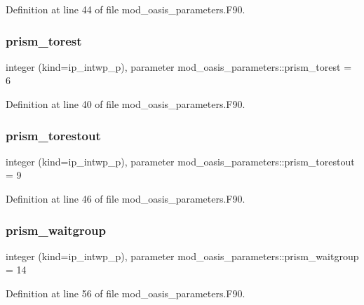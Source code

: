 Definition at line 44 of file mod\+\_\+oasis\+\_\+parameters.\+F90.

\mbox{\label{namespacemod__oasis__parameters_a8d037fafc163f46260a8704f92a885a1}} 
\subsubsection{\texorpdfstring{prism\+\_\+torest}{prism\_torest}}
{\footnotesize\ttfamily integer (kind=ip\+\_\+intwp\+\_\+p), parameter mod\+\_\+oasis\+\_\+parameters\+::prism\+\_\+torest = 6}



Definition at line 40 of file mod\+\_\+oasis\+\_\+parameters.\+F90.

\mbox{\label{namespacemod__oasis__parameters_a9ed7a0f0a9392248de5b4b15849843df}} 
\subsubsection{\texorpdfstring{prism\+\_\+torestout}{prism\_torestout}}
{\footnotesize\ttfamily integer (kind=ip\+\_\+intwp\+\_\+p), parameter mod\+\_\+oasis\+\_\+parameters\+::prism\+\_\+torestout = 9}



Definition at line 46 of file mod\+\_\+oasis\+\_\+parameters.\+F90.

\mbox{\label{namespacemod__oasis__parameters_ae5cbdfb558e82bfb8695a8cf425780cb}} 
\subsubsection{\texorpdfstring{prism\+\_\+waitgroup}{prism\_waitgroup}}
{\footnotesize\ttfamily integer (kind=ip\+\_\+intwp\+\_\+p), parameter mod\+\_\+oasis\+\_\+parameters\+::prism\+\_\+waitgroup = 14}



Definition at line 56 of file mod\+\_\+oasis\+\_\+parameters.\+F90.

